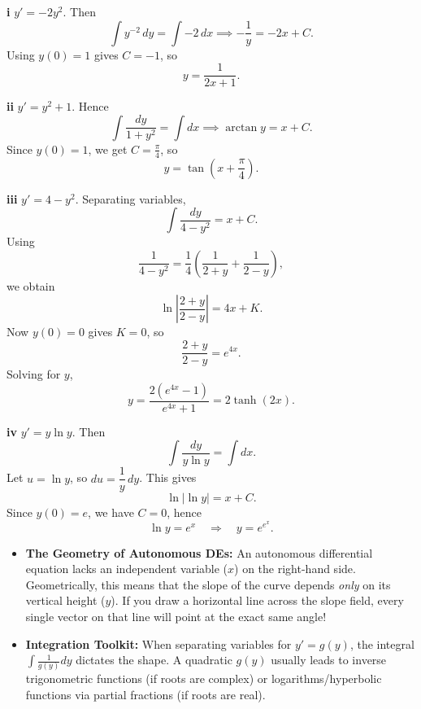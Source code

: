 \begin{solution}
\textbf{i} $y'=-2y^2$. Then
\[
\int y^{-2}\,dy=\int -2\,dx
\implies -\frac1y=-2x+C.
\]
Using $y(0)=1$ gives $C=-1$, so
\[
\boxed{y=\frac{1}{2x+1}}.
\]

\textbf{ii} $y'=y^2+1$. Hence
\[
\int \frac{dy}{1+y^2}=\int dx
\implies \arctan y=x+C.
\]
Since $y(0)=1$, we get $C=\frac{\pi}{4}$, so
\[
\boxed{y=\tan\left(x+\frac{\pi}{4}\right)}.
\]

\textbf{iii} $y'=4-y^2$. Separating variables,
\[
\int \frac{dy}{4-y^2}=x+C.
\]
Using
\[
\frac{1}{4-y^2}=\frac14\left(\frac{1}{2+y}+\frac{1}{2-y}\right),
\]
we obtain
\[
\ln\left|\frac{2+y}{2-y}\right|=4x+K.
\]
Now $y(0)=0$ gives $K=0$, so
\[
\frac{2+y}{2-y}=e^{4x}.
\]
Solving for $y$,
\[
y=\frac{2(e^{4x}-1)}{e^{4x}+1}=\boxed{2\tanh(2x)}.
\]

\textbf{iv} $y'=y\ln y$. Then
\[
\int \frac{dy}{y\ln y}=\int dx.
\]
Let $u=\ln y$, so $du=\dfrac{1}{y}\,dy$. This gives
\[
\ln|\ln y|=x+C.
\]
Since $y(0)=e$, we have $C=0$, hence
\[
\ln y=e^x
\quad\Rightarrow\quad
\boxed{y=e^{e^x}}.
\]
\end{solution}

\begin{takeaways}
\begin{itemize}[leftmargin=*]
    \item \textbf{The Geometry of Autonomous DEs:} An autonomous differential equation lacks an independent variable ($x$) on the right-hand side. Geometrically, this means that the slope of the curve depends \textit{only} on its vertical height ($y$). If you draw a horizontal line across the slope field, every single vector on that line will point at the exact same angle!
    \item \textbf{Integration Toolkit:} When separating variables for $y' = g(y)$, the integral $\int \frac{1}{g(y)} dy$ dictates the shape. A quadratic $g(y)$ usually leads to inverse trigonometric functions (if roots are complex) or logarithms/hyperbolic functions via partial fractions (if roots are real).
\end{itemize}
\end{takeaways}

